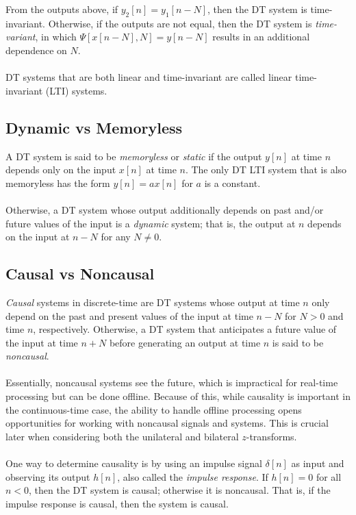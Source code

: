 \documentclass{report}
\begin{document}
From the outputs above, if $y_2[n]=y_1[n-N]$, then the DT system is time-invariant. Otherwise, if the outputs are not equal, 
then the DT system is \emph{time-variant}, in which $\Psi[x[n-N],N]=y[n-N]$ results in an additional dependence on $N$.
\\ \\
DT systems that are both linear and time-invariant are called linear time-invariant (LTI) systems.

\subsection{Dynamic vs Memoryless}
A DT system is said to be \emph{memoryless} or \emph{static} if the output $y[n]$ at time $n$ depends only on the input $x[n]$ at time $n$. The only DT LTI system 
that is also memoryless has the form $y[n]=ax[n]$ for $a$ is a constant. \\ \\
Otherwise, a DT system whose output additionally depends on past and/or future values of the input is a \emph{dynamic} system; that is, the output at $n$ 
depends on the input at $n-N$ for any $N\neq 0$. 

\subsection{Causal vs Noncausal}
\emph{Causal} systems in discrete-time are DT systems whose output at time $n$ only depend on the past and present values of the input at time $n-N$ for $N>0$ and time $n$, respectively. 
Otherwise, a DT system that anticipates a future value of the input at time $n+N$ before generating an output at time $n$ is said to be \emph{noncausal}.
\\ \\
Essentially, noncausal systems see the future, which is impractical for real-time processing but can be done offline. Because of this, while causality is important in the continuous-time case, 
the ability to handle offline processing opens opportunities for working with noncausal signals and systems. This is crucial later when considering both the unilateral and bilateral $z$-transforms.
\\ \\
One way to determine causality is by using an impulse signal $\delta[n]$ as input and observing its output $h[n]$, also called the \emph{impulse response}. If $h[n]=0$ for all $n<0$, 
then the DT system is causal; otherwise it is noncausal. That is, if the impulse response is causal, then the system is causal.
\end{document}
